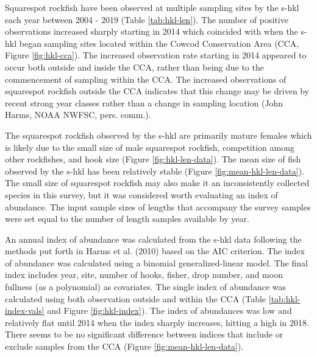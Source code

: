 \documentclass[11pt,
  english,
  a4paper,
]{article}
\begin{document}
\leavevmode\tagmcend\tagstructend\par


Squarespot rockfish have been observed at multiple sampling sites by the \Gls{s-hkl} each year between 2004 - 2019 (Table \ref{tab:hkl-len}). The number of positive observations increased sharply starting in 2014 which coincided with when the \gls{s-hkl} began sampling sites located within the Cowcod Conservation Area (CCA, Figure \ref{fig:hkl-cca}). The increased observation rate starting in 2014 appeared to occur both outside and inside the CCA, rather than being due to the commencement of sampling within the CCA. The increased observations of squarespot rockfish outside the CCA indicates that this change may be driven by recent strong year classes rather than a change in sampling location (John Harms, NOAA NWFSC, pers. comm.).

\leavevmode\tagmcend\tagstructend\par


The squarespot rockfish observed by the \Gls{s-hkl} are primarily mature females which is likely due to the small size of male squarespot rockfish, competition among other rockfishes, and hook size (Figure \ref{fig:hkl-len-data}). The mean size of fish observed by the \Gls{s-hkl} has been relatively stable (Figure \ref{fig:mean-hkl-len-data}). The small size of squarespot rockfish may also make it an inconsistently collected species in this survey, but it was considered worth evaluating an index of abundance. The input sample sizes of lengths that accompany the survey samples were set equal to the number of length samples available by year.

\leavevmode\tagmcend\tagstructend\par


An annual index of abundance was calculated from the \Gls{s-hkl} data following the methods put forth in Harms et al. {(2010)\leavevmode\tagmcend\tagstructend} based on the AIC criterion. The index of abundance was calculated using a binomial generalized-linear model. The final index includes year, site, number of hooks, fisher, drop number, and moon fullness (as a polynomial) as covariates. The single index of abundance was calculated using both observation outside and within the CCA (Table \ref{tab:hkl-index-vals} and Figure \ref{fig:hkl-index}). The index of abundances was low and relatively flat until 2014 when the index sharply increases, hitting a high in 2018. There seems to be no significant difference between indices that include or exclude samples from the CCA (Figure \ref{fig:mean-hkl-len-data}).
\end{document}
